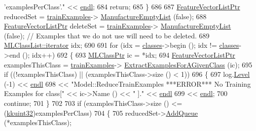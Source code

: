 \begin{DoxyCode}
{       'examplesPerClass'."} << \hyperlink{namespace_k_k_b_ad1f50f65af6adc8fa9e6f62d007818a8}{endl};
684     \textcolor{keywordflow}{return};
685   \}
686 
687   \hyperlink{class_k_k_m_l_l_1_1_feature_vector_list}{FeatureVectorListPtr}  reducedSet = \hyperlink{class_k_k_m_l_l_1_1_model_a49f61d35489e1782cd31858fd0082f8e}{trainExamples}->
      \hyperlink{class_k_k_m_l_l_1_1_feature_vector_list_af533da1b34e4123f4fcb1343d5f48e37}{ManufactureEmptyList} (\textcolor{keyword}{false});
688   \hyperlink{class_k_k_m_l_l_1_1_feature_vector_list}{FeatureVectorListPtr}  deleteSet  = \hyperlink{class_k_k_m_l_l_1_1_model_a49f61d35489e1782cd31858fd0082f8e}{trainExamples}->
      \hyperlink{class_k_k_m_l_l_1_1_feature_vector_list_af533da1b34e4123f4fcb1343d5f48e37}{ManufactureEmptyList} (\textcolor{keyword}{false});  \textcolor{comment}{// Examples that we do not use will need to be deleted.}
689   \hyperlink{class_k_k_b_1_1_k_k_queue_aa3c2796a726eea468b94132a9fbf2cfe}{MLClassList::iterator}  idx;
690 
691   \textcolor{keywordflow}{for}  (idx = \hyperlink{class_k_k_m_l_l_1_1_model_a764e7680f07814c3c5313dc4e4de60a1}{classes}->begin ();  idx != \hyperlink{class_k_k_m_l_l_1_1_model_a764e7680f07814c3c5313dc4e4de60a1}{classes}->end ();  idx++)
692   \{
693     \hyperlink{class_k_k_m_l_l_1_1_m_l_class}{MLClassPtr}  ic = *idx;
694     \hyperlink{class_k_k_m_l_l_1_1_feature_vector_list}{FeatureVectorListPtr}  examplesThisClass = \hyperlink{class_k_k_m_l_l_1_1_model_a49f61d35489e1782cd31858fd0082f8e}{trainExamples}->
      \hyperlink{class_k_k_m_l_l_1_1_feature_vector_list_ab9c72c62046bf92e24e7e635d425792b}{ExtractExamplesForAGivenClass} (ic);
695     \textcolor{keywordflow}{if}  ((!examplesThisClass)  ||  (examplesThisClass->size () < 1))
696     \{
697       log.\hyperlink{class_k_k_b_1_1_run_log_a32cf761d7f2e747465fd80533fdbb659}{Level} (-1) << \hyperlink{namespace_k_k_b_ad1f50f65af6adc8fa9e6f62d007818a8}{endl}
698         << \textcolor{stringliteral}{"Model::ReduceTrainExamples   ***ERROR***   No Training Examples for class["} << ic->Name () << \textcolor{stringliteral}{"
      ]."} << \hyperlink{namespace_k_k_b_ad1f50f65af6adc8fa9e6f62d007818a8}{endl}
699         << \hyperlink{namespace_k_k_b_ad1f50f65af6adc8fa9e6f62d007818a8}{endl};
700       \textcolor{keywordflow}{continue};
701     \}
702 
703     \textcolor{keywordflow}{if}  (examplesThisClass->size () <= (\hyperlink{namespace_k_k_b_af8d832f05c54994a1cce25bd5743e19a}{kkuint32})examplesPerClass)
704     \{
705       reducedSet->\hyperlink{class_k_k_m_l_l_1_1_feature_vector_list_a90809e07f7e33e591da0d266c1907ca9}{AddQueue} (*examplesThisClass);

\end{DoxyCode}
